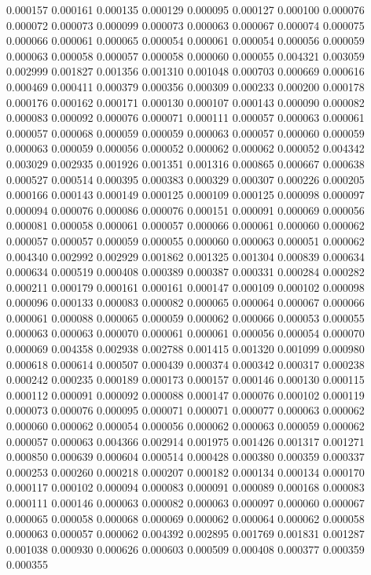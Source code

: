 0.000157
0.000161
0.000135
0.000129
0.000095
0.000127
0.000100
0.000076
0.000072
0.000073
0.000099
0.000073
0.000063
0.000067
0.000074
0.000075
0.000066
0.000061
0.000065
0.000054
0.000061
0.000054
0.000056
0.000059
0.000063
0.000058
0.000057
0.000058
0.000060
0.000055
0.004321
0.003059
0.002999
0.001827
0.001356
0.001310
0.001048
0.000703
0.000669
0.000616
0.000469
0.000411
0.000379
0.000356
0.000309
0.000233
0.000200
0.000178
0.000176
0.000162
0.000171
0.000130
0.000107
0.000143
0.000090
0.000082
0.000083
0.000092
0.000076
0.000071
0.000111
0.000057
0.000063
0.000061
0.000057
0.000068
0.000059
0.000059
0.000063
0.000057
0.000060
0.000059
0.000063
0.000059
0.000056
0.000052
0.000062
0.000062
0.000052
0.004342
0.003029
0.002935
0.001926
0.001351
0.001316
0.000865
0.000667
0.000638
0.000527
0.000514
0.000395
0.000383
0.000329
0.000307
0.000226
0.000205
0.000166
0.000143
0.000149
0.000125
0.000109
0.000125
0.000098
0.000097
0.000094
0.000076
0.000086
0.000076
0.000151
0.000091
0.000069
0.000056
0.000081
0.000058
0.000061
0.000057
0.000066
0.000061
0.000060
0.000062
0.000057
0.000057
0.000059
0.000055
0.000060
0.000063
0.000051
0.000062
0.004340
0.002992
0.002929
0.001862
0.001325
0.001304
0.000839
0.000634
0.000634
0.000519
0.000408
0.000389
0.000387
0.000331
0.000284
0.000282
0.000211
0.000179
0.000161
0.000161
0.000147
0.000109
0.000102
0.000098
0.000096
0.000133
0.000083
0.000082
0.000065
0.000064
0.000067
0.000066
0.000061
0.000088
0.000065
0.000059
0.000062
0.000066
0.000053
0.000055
0.000063
0.000063
0.000070
0.000061
0.000061
0.000056
0.000054
0.000070
0.000069
0.004358
0.002938
0.002788
0.001415
0.001320
0.001099
0.000980
0.000618
0.000614
0.000507
0.000439
0.000374
0.000342
0.000317
0.000238
0.000242
0.000235
0.000189
0.000173
0.000157
0.000146
0.000130
0.000115
0.000112
0.000091
0.000092
0.000088
0.000147
0.000076
0.000102
0.000119
0.000073
0.000076
0.000095
0.000071
0.000071
0.000077
0.000063
0.000062
0.000060
0.000062
0.000054
0.000056
0.000062
0.000063
0.000059
0.000062
0.000057
0.000063
0.004366
0.002914
0.001975
0.001426
0.001317
0.001271
0.000850
0.000639
0.000604
0.000514
0.000428
0.000380
0.000359
0.000337
0.000253
0.000260
0.000218
0.000207
0.000182
0.000134
0.000134
0.000170
0.000117
0.000102
0.000094
0.000083
0.000091
0.000089
0.000168
0.000083
0.000111
0.000146
0.000063
0.000082
0.000063
0.000097
0.000060
0.000067
0.000065
0.000058
0.000068
0.000069
0.000062
0.000064
0.000062
0.000058
0.000063
0.000057
0.000062
0.004392
0.002895
0.001769
0.001831
0.001287
0.001038
0.000930
0.000626
0.000603
0.000509
0.000408
0.000377
0.000359
0.000355

